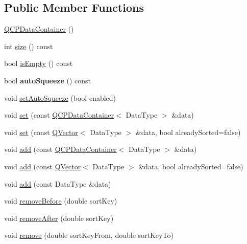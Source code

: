 \subsection*{Public Member Functions}
\begin{DoxyCompactItemize}
\item 
\hyperlink{class_q_c_p_data_container_af86c0c63719f92c360ff67cc06c6fe6f}{Q\+C\+P\+Data\+Container} ()
\item 
int \hyperlink{class_q_c_p_data_container_a8e9b262c739672e13472d0d45b720258}{size} () const
\item 
bool \hyperlink{class_q_c_p_data_container_a7bdebfccd2f9f84bf032882f9d6b00a8}{is\+Empty} () const
\item 
\mbox{\label{class_q_c_p_data_container_a64f0f1621ca46de2352eaf87476db9b1}} 
bool {\bfseries auto\+Squeeze} () const
\item 
void \hyperlink{class_q_c_p_data_container_a233f866760a78950d2a393c1a4bc54b5}{set\+Auto\+Squeeze} (bool enabled)
\item 
void \hyperlink{class_q_c_p_data_container_ae7042bd534fc3ce7befa2ce3f790b5bf}{set} (const \hyperlink{class_q_c_p_data_container}{Q\+C\+P\+Data\+Container}$<$ Data\+Type $>$ \&data)
\item 
void \hyperlink{class_q_c_p_data_container_aff99fffbb26597a354c4bc8312596ab2}{set} (const \hyperlink{class_q_vector}{Q\+Vector}$<$ Data\+Type $>$ \&data, bool already\+Sorted=false)
\item 
void \hyperlink{class_q_c_p_data_container_a42b98bd994307ccd163a43d576f91ad9}{add} (const \hyperlink{class_q_c_p_data_container}{Q\+C\+P\+Data\+Container}$<$ Data\+Type $>$ \&data)
\item 
void \hyperlink{class_q_c_p_data_container_a51d2a4c9ce4baf5e950b767d26673972}{add} (const \hyperlink{class_q_vector}{Q\+Vector}$<$ Data\+Type $>$ \&data, bool already\+Sorted=false)
\item 
void \hyperlink{class_q_c_p_data_container_a715e8e9972466804954a2f8fbd5288b7}{add} (const Data\+Type \&data)
\item 
void \hyperlink{class_q_c_p_data_container_aa7f74cbce304b0369e1626c3798e1eda}{remove\+Before} (double sort\+Key)
\item 
void \hyperlink{class_q_c_p_data_container_abbe5d87ffc10b5aeffa5bb42cf03aa3c}{remove\+After} (double sort\+Key)
\item 
void \hyperlink{class_q_c_p_data_container_ae5f569a120648b167efa78835f12fd38}{remove} (double sort\+Key\+From, double sort\+Key\+To)

\end{DoxyCompactItemize}
